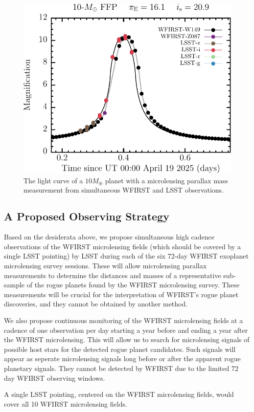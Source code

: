 \begin{figure}[t]
\centering\includegraphics[width=0.5\linewidth]{figs/WFIRST/lsst_lsstm+10_0_7220351_320_det_lc.pdf}
\caption{The light curve of a $10 M_{\oplus}$ planet with a microlensing parallax
mass measurement from simultaneous WFIRST and LSST observations.
\label{fig-lc}}
\end{figure}


\subsection{A Proposed Observing Strategy}
\label{sec:\secname:proposal}

Based on the desiderata above, we
propose simultaneous high cadence observations of the WFIRST microlensing fields
(which should be covered by a single LSST pointing) by LSST during each
of the six 72-day WFIRST exoplanet microlensing survey sessions. These
will allow microlensing parallax measurements to determine the distances
and masses of a representative sub-sample of the rogue planets found by
the WFIRST microlensing survey. These measurements will be crucial for
the interpretation of WFIRST's rogue planet discoveries, and they
cannot be obtained by another method.

We also propose continuous monitoring of the WFIRST microlensing fields
at a cadence of one observation per day
starting a year before and ending a year after the WFIRST microlensing.
This will allow us to search for microlensing signals of possible
host stars for the detected rogue planet candidates. Such signals will
appear as seperate microlensing signals long before or after the apparent
rogue planetary signals. They cannot be detected by WFIRST due to the
limited 72 day WFIRST observing windows.

A single LSST pointing, centered on the WFIRST microlensing
fields, would cover all 10 WFIRST microlensing fields.

